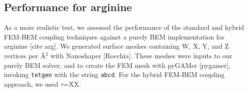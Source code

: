 
\subsection*{\sffamily \large Performance for arginine}

As a more realistic test, we assessed the performance of the standard and hybrid FEM-BEM coupling techniques against a purely BEM implementation for arginine [cite arg]. 
We generated surface meshes containing W, X, Y, and Z vertices per \AA$^2$ with Nanoshaper [Rocchia].
These meshes were inputs to our purely BEM solver, and to create the FEM mesh with pyGAMer [pygamer], invoking \texttt{tetgen} with the string \texttt{abcd}.
For the hybrid FEM-BEM coupling approach, we used $\tau$=XX.

